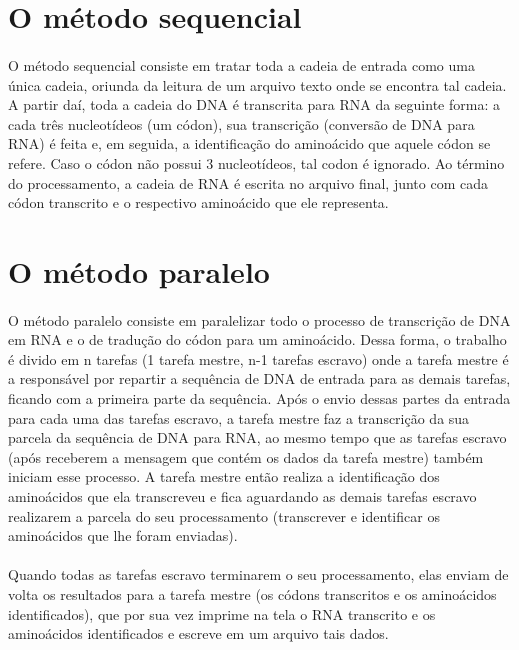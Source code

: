 \documentclass[a4paper,10pt]{article}
\begin{document}
\section{O método sequencial}

\paragraph{}O método sequencial consiste em tratar toda a cadeia de entrada como uma única cadeia, oriunda da leitura de um arquivo texto onde se encontra tal cadeia. A partir daí, toda a cadeia do DNA é transcrita para RNA da seguinte forma: a cada três nucleotídeos (um códon), sua transcrição (conversão de DNA para RNA) é feita e, em seguida, a identificação do aminoácido que aquele códon se refere. Caso o códon não possui 3 nucleotídeos, tal codon é ignorado. Ao término do processamento, a cadeia de RNA é escrita no arquivo final, junto com cada códon transcrito e o respectivo aminoácido que ele representa.

\section{O método paralelo}

\paragraph{}O método paralelo consiste em paralelizar todo o processo de transcrição de DNA em RNA e o de tradução do códon para um aminoácido. Dessa forma, o trabalho é divido em n tarefas (1 tarefa mestre, n-1 tarefas escravo) onde a tarefa mestre é a responsável por repartir a sequência de DNA de entrada para as demais tarefas, ficando com a primeira parte da sequência. Após o envio dessas partes da entrada para cada uma das tarefas escravo, a tarefa mestre faz a transcrição da sua parcela da sequência de DNA para RNA, ao mesmo tempo que as tarefas escravo (após receberem a mensagem que contém os dados da tarefa mestre) também iniciam esse processo. A tarefa mestre então realiza a identificação dos aminoácidos que ela transcreveu e fica aguardando as demais tarefas escravo realizarem a parcela do seu processamento (transcrever e identificar os aminoácidos que lhe foram enviadas).\\
\paragraph{}Quando todas as tarefas escravo terminarem o seu processamento, elas enviam de volta os resultados para a tarefa mestre (os códons transcritos e os aminoácidos identificados), que por sua vez imprime na tela o RNA transcrito e os aminoácidos identificados e escreve em um arquivo tais dados.
\end{document}
